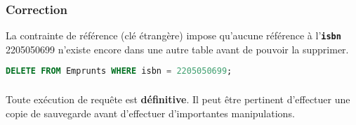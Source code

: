 \documentclass[svgnames,11pt]{beamer}
\begin{document}
\begin{frame}[fragile]
    \frametitle{Correction}
La contrainte de référence (clé étrangère) impose qu'aucune référence à l'\texttt{\textbf{isbn}} 2205050699 n'existe encore dans une autre table avant de pouvoir la supprimer.
    \begin{center}
        \begin{lstlisting}[language=SQL , basicstyle=\ttfamily\small, xleftmargin=1em, xrightmargin=-1em]
DELETE FROM Emprunts WHERE isbn = 2205050699;
\end{lstlisting}
    \end{center}   

\end{frame}
\begin{frame}
    \frametitle{}

    \begin{aretenir}[]
        Toute exécution de requête est \textbf{définitive}. Il peut être pertinent d'effectuer une copie de sauvegarde avant d'effectuer d'importantes manipulations.
        \end{aretenir}

\end{frame}
\end{document}
